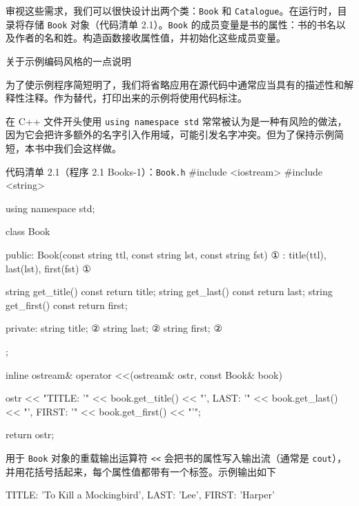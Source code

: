 审视这些需求，我们可以很快设计出两个类：\texttt{Book} 和 \texttt{Catalogue}。在运行时，目录将存储 \texttt{Book} 对象（代码清单 2.1）。\texttt{Book} 的成员变量是书的属性：书的书名以及作者的名和姓。构造函数接收属性值，并初始化这些成员变量。

\begin{mySidebar}{关于示例编码风格的一点说明}

为了使示例程序简短明了，我们将省略应用在源代码中通常应当具有的描述性和解释性注释。作为替代，打印出来的示例将使用代码标注。

在 C++ 文件开头使用 \texttt{using namespace std} 常常被认为是一种有风险的做法，因为它会把许多额外的名字引入作用域，可能引发名字冲突。但为了保持示例简短，本书中我们会这样做。
\end{mySidebar}

\begin{codeboxt}{代码清单 2.1（程序 2.1 Books-1）：\texttt{Book.h}}
#include <iostream>
#include <string>

using namespace std;

class Book
{
public:
    Book(const string ttl, const string lst, const string fst) ①
        : title(ttl), last(lst), first(fst) {}                 ①
 
    string get_title() const { return title; }
    string get_last()  const { return last; }
    string get_first() const { return first; }

private:
    string title;                                              ②
    string last;                                               ②
    string first;                                              ②
};

inline ostream& operator <<(ostream& ostr, const Book& book)
{
    ostr << "{TITLE: '"   << book.get_title()
         << "', LAST: '"  << book.get_last()
         << "', FIRST: '" << book.get_first() << "'}";

    return ostr;
}
\end{codeboxt}
\par
{}\par

用于 \texttt{Book} 对象的重载输出运算符 \texttt{<<} 会把书的属性写入输出流（通常是 \texttt{cout}），并用花括号括起来，每个属性值都带有一个标签。示例输出如下

\begin{codebox}
  {TITLE: 'To Kill a Mockingbird', LAST: 'Lee', FIRST: 'Harper'}
\end{codebox}

